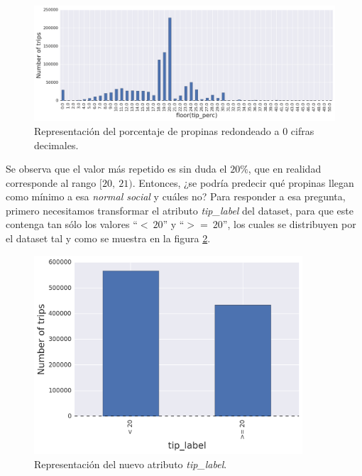 \begin{figure}[ht]
  \centering
  \includegraphics[width=140mm]{figures/ch_05/tip_perc.png}
  \caption{Representación del porcentaje de propinas redondeado a $0$ cifras decimales.}
  \label{fig:5.14}
\end{figure}

\pagebreak

Se observa que el valor más repetido es sin duda el $20\%$, que en realidad corresponde al rango $[20,\:21)$. Entonces, ¿se podría predecir qué propinas llegan como mínimo a esa \emph{normal social} y cuáles no? Para responder a esa pregunta, primero necesitamos transformar el atributo \emph{tip\_label} del dataset, para que este contenga tan sólo los valores ``$<\:20$'' y ``$>=\:20$'', los cuales se distribuyen por el dataset tal y como se muestra en la figura \ref{fig:5.15}.

\begin{figure}[H]
  \centering
  \includegraphics[width=100mm]{figures/ch_05/tip_label_2.png}
  \caption{Representación del nuevo atributo \emph{tip\_label}.}
  \label{fig:5.15}
\end{figure}

